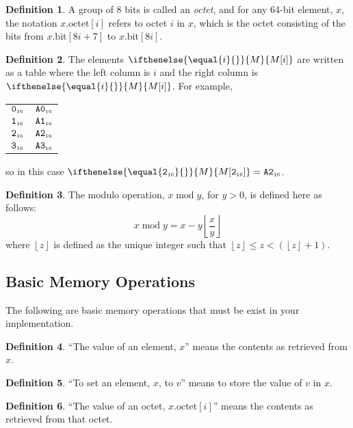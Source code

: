\documentclass[a4paper,12pt]{article}
\makeatletter
\newcommand{\num}[1]{\texttt{#1}}
\newcommand{\hex}[1]{\num{#1}_{\textup{\tiny 16}}}
\newcommand{\MEM}[1]{\ifthenelse{\equal{#1}{}}{M}{M[#1]}}
\newcommand{\octno}[2]{#1.\mathrm{octet}[#2]}
\newcommand{\bitno}[2]{#1.\mathrm{bit}[#2]}
\DeclareMathOperator{\MOD}{mod}
\newcommand{\modulo}[2]{#1 \MOD #2}
\theoremstyle{definition}
\newtheorem{definition}{Definition}
\newenvironment{memtable}{%
  \begin{trivlist}
    \item
    }{%
    \end{trivlist}}
\newenvironment{memcolumn}{%
  \begin{tabular}{@{}ll@{}}
    \hline}
    {%
    \hline
  \end{tabular}}
\makeatother
\begin{document}
\begin{definition}
A group of 8 bits is called an \emph{octet}, and for any 64-bit element, $x$, the notation $\octno{x}{i}$ refers to octet $i$ in $x$, which is the octet consisting of the bits from $\bitno{x}{8i+7}$ to $\bitno{x}{8i}$.
\end{definition}

\begin{definition}
The elements $\MEM{i}$ are written as a table where the left column is $i$ and the right column is $\MEM{i}$.  For example,
\begin{memtable}
  \begin{memcolumn}
    $\hex{0}$ & $\hex{A0}$ \\
    $\hex{1}$ & $\hex{A1}$ \\
    $\hex{2}$ & $\hex{A2}$ \\
    $\hex{3}$ & $\hex{A3}$ \\
  \end{memcolumn}
\end{memtable}
so in this case $\MEM{\hex{2}} = \hex{A2}$.
\end{definition}

\begin{definition}
The modulo operation, $\modulo{x}{y}$, for $y>0$, is defined here as follows:
\[ \modulo{x}{y} = x - y \left \lfloor \frac{x}{y} \right \rfloor \]
where $\left \lfloor z \right \rfloor$ is defined as the unique integer such that $\left \lfloor z \right \rfloor \le z < (\left \lfloor z \right \rfloor + 1)$.
\end{definition}

\subsection{Basic Memory Operations}
\label{sec:memory-operations}

The following are basic memory operations that must be exist in your implementation.

\begin{definition}
``The value of an element, $x$'' means the contents as retrieved from $x$.
\end{definition}

\begin{definition}
``To set an element, $x$, to $v$'' means to store the value of $v$ in $x$.
\end{definition}

\begin{definition}
``The value of an octet, $\octno{x}{i}$'' means the contents as retrieved from that octet.
\end{definition}
\end{document}
